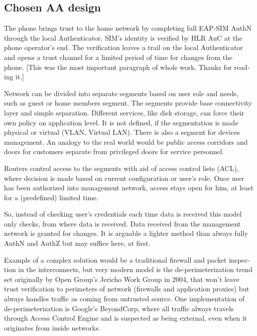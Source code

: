 \documentclass[12pt,a4paper,english]{tutthesis}
\begin{document}
\begin{otherlanguage}{english}
\section{Chosen AA design}
\label{sec-4-2}
\label{sec:chosendesign}

The phone brings trust to the home network by completing full EAP-SIM AuthN through
the local Authenticator. SIM's identity is verified by HLR AuC at the phone
operator's end. The verification leaves a trail on the local Authenticator and
opens a trust channel for a limited period of time for changes from the phone.
[This was the most important paragraph of whole work. Thanks for
reading it.]



Network can be divided into separate segments based on user role and
needs, such as guest or home members segment. The segments provide
base connectivity layer and simple separation. Different
services, like disk storage, can force their own policy on application
level.
It is not defined, if the segmentation is made 
physical or virtual (VLAN, Virtual LAN). 
There is also a segment for devices management. 
An analogy to the real world would be public access corridors and doors for
customers separate from privileged doors for service personnel.


Routers control access to the segments with aid of 
access control lists (ACL), where decision is made based on current configuration or user's
role.  Once user has been authorized into management network, access
stays open for him, at least for a (predefined) limited time.

So, instead of checking user's credentials each time data is received
this model only checks, from where data is received. 
Data received from the management network is granted for changes.
It is arguable a lighter method than always
fully AuthN and AuthZ but may suffice here, at first.



Example of a complex solution would be a traditional firewall and packet
inspection in the interconnects, but very modern model
is the de-perimeterization trend set originally by Open Group's
Jericho Work Group in 2004, that won't leave trust verification to
perimeters of network (firewalls and application proxies) but 
always handles traffic as coming from untrusted source.\cite{jericho2004}
One implementation of de-perimeterization is 
Google's BeyondCorp\cite{2014-beyondcorp}, 
where all traffic always travels through Access Control Engine
and is suspected as being external, even when it originates from
inside networks. 






\end{otherlanguage}
\end{document}
